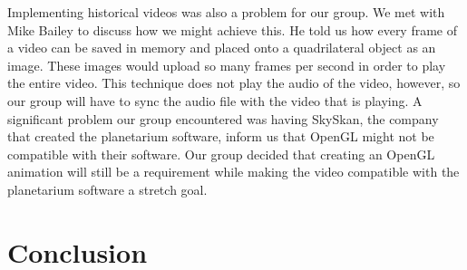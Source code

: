 \documentclass[onecolumn, draftclsnofoot,10pt, compsoc]{IEEEtran}
\begin{document}
Implementing historical videos was also a problem for our group. We met with Mike Bailey to discuss how we might achieve this. He told us how every frame of a video can be saved in memory and placed onto a quadrilateral object as an image. These images would upload so many frames per second in order to play the entire video. This technique does not play the audio of the video, however, so our group will have to sync the audio file with the video that is playing. A significant problem our group encountered was having SkySkan, the company that created the planetarium software, inform us that OpenGL might not be compatible with their software. Our group decided that creating an OpenGL animation will still be a requirement while making the video compatible with the planetarium software a stretch goal.  


\section{Conclusion}
\end{document}
